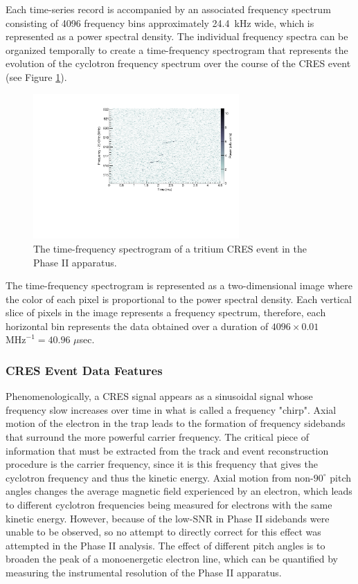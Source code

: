 Each time-series record is accompanied by an associated frequency spectrum consisting of 4096 frequency bins approximately 24.4~kHz wide, which is represented as a power spectral density. The individual frequency spectra can be organized temporally to create a time-frequency spectrogram that represents the evolution of the cyclotron frequency spectrum over the course of the CRES event (see Figure \ref{fig:chap3-tritium-event0-spectrogram}). 
\begin{figure}[htbp]
    \centering
    \includegraphics[width=0.7\textwidth]{figs/Chapter-3/T2_Event0.pdf}
    \caption{The time-frequency spectrogram of a tritium CRES event in the Phase II apparatus.}
    \label{fig:chap3-tritium-event0-spectrogram}
\end{figure}
The time-frequency spectrogram is represented as a two-dimensional image where the color of each pixel is proportional to the power spectral density. Each vertical slice of pixels in the image represents a frequency spectrum, therefore, each horizontal bin represents the data obtained over a duration of $4096\times 0.01$ $\mathrm{MHz}^{-1}=40.96$ $\mu$sec. 

\subsubsection*{CRES Event Data Features}

Phenomenologically, a CRES signal appears as a sinusoidal signal whose frequency slow increases over time in what is called a frequency "chirp". Axial motion of the electron in the trap leads to the formation of frequency sidebands that surround the more powerful carrier frequency. The critical piece of information that must be extracted from the track and event reconstruction procedure is the carrier frequency, since it is this frequency that gives the cyclotron frequency and thus the kinetic energy. Axial motion from non-$90^\circ$ pitch angles changes the average magnetic field experienced by an electron, which leads to different cyclotron frequencies being measured for electrons with the same kinetic energy. However, because of the low-SNR in Phase II sidebands were unable to be observed, so no attempt to directly correct for this effect was attempted in the Phase II analysis. The effect of different pitch angles is to broaden the peak of a monoenergetic electron line, which can be quantified by measuring the instrumental resolution of the Phase II apparatus.

